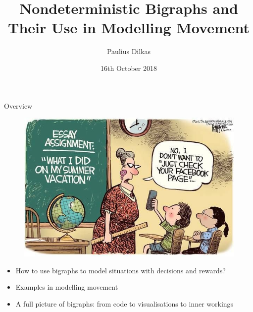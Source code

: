 \documentclass{beamer}
\author{Paulius Dilkas}
\title[Nondeterministic Bigraphs]{Nondeterministic Bigraphs and Their Use in
  Modelling Movement}
\institute[]{Formal Analysis, Theory and Algorithms}
\date{16th October 2018}
\begin{document}
\maketitle

\begin{frame}{Overview}
  \begin{figure}
    \centering
    \includegraphics[height=0.5\textheight]{summer-vacation.jpg}
  \end{figure}
  \pause
  \begin{itemize}
  \item How to use bigraphs to model situations with decisions and rewards?
  \item Examples in modelling movement
  \item A full picture of bigraphs: from code to visualisations to inner workings
  \end{itemize}
\end{frame}
\end{document}

